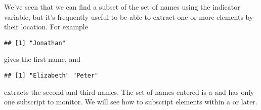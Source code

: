 We've seen that we can find a subset of the set of names using the indicator variable, but it's frequently useful to be able to extract one or more elements by their location. For example 
\begin{knitrout}
\color{fgcolor}\begin{kframe}
\begin{alltt}
\hlstd{Names[}\hlstd{]}
\end{alltt}
\begin{verbatim}
## [1] "Jonathan"
\end{verbatim}
\end{kframe}
\end{knitrout}
gives the first name, and  
\begin{knitrout}
\color{fgcolor}\begin{kframe}
\begin{alltt}
\hlstd{Names[}\hlopt{:}\hlstd{]}
\end{alltt}
\begin{verbatim}
## [1] "Elizabeth" "Peter"
\end{verbatim}
\end{kframe}
\end{knitrout}
extracts the second and third names. The set of names entered is a  and has only one subscript to monitor. We will see how to subscript elements within a  or  later. 
 
